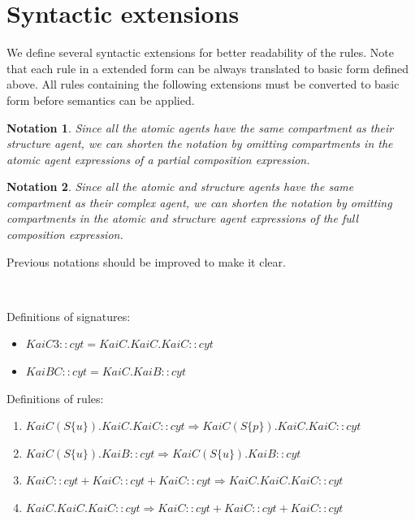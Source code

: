 \documentclass{elsarticle}
\newtheorem{notation}{Notation}
\begin{document}
\section{Syntactic extensions}

We define several syntactic extensions for better readability of the rules. Note that each rule in a extended form can be always translated to basic form defined above. All rules containing the following extensions must be converted to basic form before semantics can be applied.

\begin{notation}\label{shortcut:structure}
Since all the atomic agents have the same compartment as their structure agent, we can shorten the notation by omitting compartments in the atomic agent expressions of a partial composition expression.
\end{notation}

\begin{notation}\label{shortcut:complex}
Since all the atomic and structure agents have the same compartment as their complex agent, we can shorten the notation by omitting compartments in the atomic and structure agent expressions of the full composition expression.
\end{notation}

Previous notations should be improved to make it clear.

\begin{running_example}\label{run1}
$ $

\noindent Definitions of signatures: 
\begin{itemize}
\item $KaiC3::cyt = KaiC.KaiC.KaiC::cyt$
\item $KaiBC::cyt = KaiC.KaiB::cyt$
\end{itemize}

\noindent Definitions of rules:
\begin{enumerate}
\item $KaiC(S\{u\}).KaiC.KaiC::cyt \Rightarrow KaiC(S\{p\}).KaiC.KaiC::cyt$
\item $KaiC(S\{u\}).KaiB::cyt \Rightarrow KaiC(S\{u\}).KaiB::cyt$
\item $KaiC::cyt + KaiC::cyt + KaiC::cyt \Rightarrow KaiC.KaiC.KaiC::cyt$
\item $KaiC.KaiC.KaiC::cyt \Rightarrow KaiC::cyt + KaiC::cyt + KaiC::cyt$
\end{enumerate}
\end{running_example}
\end{document}
